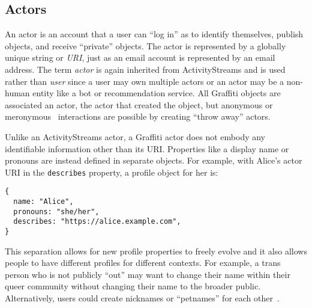 \subsection{Actors}
\label{concepts:actors}

An actor is an account that a user can ``log in'' as
to identify themselves, publish objects, and receive ``private'' objects.
The actor is represented by a globally unique string or \emph{URI},
just as an email account is represented by an email address.
The term \emph{actor} is again inherited from ActivityStreams
and is used rather than \emph{user} since a user may own
multiple actors or
an actor may be a non-human entity
like a bot or recommendation service.
All Graffiti objects are associated an actor, the actor
that created the object, but anonymous
or meronymous~\cite{meronymous} interactions are possible by
creating ``throw away'' actors.




Unlike an ActivityStreams actor, a Graffiti actor does not embody any identifiable information other than its
URI.
Properties like a display name or pronouns are instead
defined in separate objects.
For example, with Alice's actor URI in the \texttt{describes}
property, a profile object for her is:
\begin{verbatim}
{
  name: "Alice",
  pronouns: "she/her",
  describes: "https://alice.example.com",
}
\end{verbatim}

This separation allows for new profile
properties to freely evolve
and it also allows people to have different profiles for different contexts.
For example, a trans person who is not publicly ``out'' may want to
change their name within their queer community without
changing their name to the broader public.
Alternatively, users could create nicknames
or ``petnames'' for each other~\cite{petnames}.

